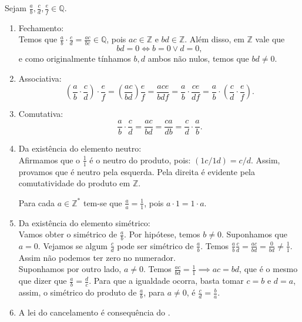 \documentclass[../main.tex]{subfiles}
\begin{document}
\begin{dem}
    Sejam $\frac{a}{b}, \frac{c}{d}, \frac{e}{f} \in \mathbb{Q}$.
    \begin{enumerate}[label=(\roman*)]
        \item Fechamento: \\
        Temos que $\frac{a}{b} \cdot \frac{c}{d} = \frac{ac}{bc} \in \mathbb{Q}$, pois  
        $ac \in \mathbb{Z}$ e $bd \in \mathbb{Z}$. Além disso, em $\mathbb{Z}$ vale que 
        \[ bd = 0 \iff b = 0 \lor d = 0, \] e como originalmente tínhamos $b,d$ ambos não nulos, temos que $bd \neq 0$.
        
        \item Associativa: \\
            \[
            \left( \frac{a}{b} \cdot \frac{c}{d}\right) \cdot \frac{e}{f} = 
            \left(\frac{ac}{bd}\right) \frac{e}{f} = 
            \frac{ace}{bdf} = \frac{a}{b} \cdot \frac{ce}{df} = 
            \frac{a}{b} \cdot \left(\frac{c}{d} \cdot \frac{e}{f}\right)
            .
            \]
        
        \item Comutativa: \\
        \[ \frac{a}{b} \cdot \frac{c}{d} = 
            \frac{ac}{bd} = 
            \frac{ca}{db} = 
            \frac{c}{d} \cdot \frac{a}{b} . \]
            
        
        \item Da existência do elemento neutro: \\
        Afirmamos que o $\frac{1}{1}$ é o neutro do produto, pois: $\left(1c/1d \right) = c/d$.
        Assim, provamos que é neutro pela esquerda. Pela direita é evidente pela comutatividade do produto em $\mathbb{Z}$. 
        \begin{obs}
            Para cada $a \in \mathbb{Z}^*$ tem-se que $\frac{a}{a}=\frac{1}{1}$, pois $a \cdot 1 = 1 \cdot a.$
        \end{obs}
        
        \item Da existência do elemento simétrico: \\
        Vamos obter o simétrico de $\frac{a}{b}$. Por hipótese, temos $b \neq 0$. Suponhamos que $a=0$. Vejamos se algum $\frac{c}{d}$
        pode ser simétrico de $\frac{a}{b}$. Temos $\frac{a}{b} \frac{c}{d} = \frac{ac}{bd} = \frac{0}{bd} \neq \frac{1}{1}$. Assim não podemos ter zero no numerador. \\
        Suponhamos por outro lado, $a \neq 0$. Temos $\frac{ac}{bd} = \frac{1}{1} \implies ac = bd$, que é o mesmo que dizer que $\frac{a}{b} = \frac{d}{c}$. Para que a igualdade ocorra, basta tomar $c=b$ e $d=a$, assim, o simétrico do produto de $\frac{a}{b}$, para $a \neq 0$, é $\frac{c}{d} = \frac{b}{a}$.
        
        \item A lei do cancelamento é consequência do .
    \end{enumerate}    
\end{dem}
\end{document}
